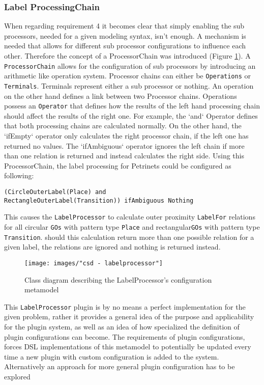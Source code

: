 \subsubsection{Label ProcessingChain}
When regarding requirement 4 it becomes clear that simply enabling the sub processors, needed for a given modeling syntax, isn't enough. A mechanism is needed that allows for different sub processor configurations to influence each other. Therefore the concept of a ProcessorChain was introduced (Figure \ref{fig:labelprocessor-config}). A \texttt{ProcessorChain} allows for the configuration of sub processors by introducing an arithmetic like operation system. Processor chains can either be \texttt{Operations} or \texttt{Terminals}. Terminals represent either a sub processor or nothing. An operation on the other hand defines a link between two Processor chains. Operations possess an \texttt{Operator} that defines how the results of the left hand processing chain should affect the results of the right one. For example, the `and` Operator defines that both processing chains are calculated normally. On the other hand, the `ifEmpty` operator only calculates the right processor chain, if the left one has returned no values. The `ifAmbiguous` operator ignores the left chain if more than one relation is returned and instead calculates the right side. Using this ProcessorChain, the label processing for Petrinets could be configured as following:
\begin{lstlisting}
(CircleOuterLabel(Place) and 
RectangleOuterLabel(Transition)) ifAmbiguous Nothing
\end{lstlisting}
This causes the \texttt{LabelProcessor} to calculate outer proximity \texttt{LabelFor} relations for all circular \texttt{GOs} with pattern type \texttt{Place} and rectangular\texttt{GOs} with pattern type \texttt{Transition}. should this calculation return more than one possible relation for a given label, the relations are ignored and nothing is returned instead.

\begin{figure}[ht]
  \centering
  \texttt{[image: images/"csd - labelprocessor"]}
  \caption{Class diagram describing the LabelProcessor's configuration metamodel}
  \label{fig:labelprocessor-config}
\end{figure}

This \texttt{LabelProcessor} plugin is by no means a perfect implementation for the given problem, rather it provides a general idea of the purpose and applicability for the plugin system, as well as an idea of how specialized the definition of plugin configurations can become. The requirements of plugin configurations, forces DSL implementations of this metamodel to potentially be updated every time a new plugin with custom configuration is added to the system. Alternatively an approach for more general plugin configuration has to be explored


